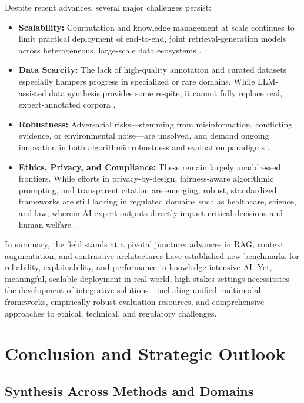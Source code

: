 Despite recent advances, several major challenges persist:
\begin{itemize}
    \item \textbf{Scalability:} Computation and knowledge management at scale continues to limit practical deployment of end-to-end, joint retrieval-generation models across heterogeneous, large-scale data ecosystems \cite{ref1,ref4,ref7,ref10,ref21,ref29,ref38,ref46,ref49,ref51,ref52,ref54,ref61,ref62}.
    \item \textbf{Data Scarcity:} The lack of high-quality annotation and curated datasets especially hampers progress in specialized or rare domains. While LLM-assisted data synthesis provides some respite, it cannot fully replace real, expert-annotated corpora \cite{ref8,ref16,ref19,ref22,ref26,ref28,ref31,ref34,ref36}.
    \item \textbf{Robustness:} Adversarial risks—stemming from misinformation, conflicting evidence, or environmental noise—are unsolved, and demand ongoing innovation in both algorithmic robustness and evaluation paradigms \cite{ref2,ref3,ref7,ref37,ref39,ref49,ref51,ref54}.
    \item \textbf{Ethics, Privacy, and Compliance:} These remain largely unaddressed frontiers. While efforts in privacy-by-design, fairness-aware algorithmic prompting, and transparent citation are emerging, robust, standardized frameworks are still lacking in regulated domains such as healthcare, science, and law, wherein AI-expert outputs directly impact critical decisions and human welfare \cite{ref6,ref13,ref23,ref30,ref37,ref45,ref55,ref62,ref63}.
\end{itemize}

In summary, the field stands at a pivotal juncture: advances in RAG, context augmentation, and contrastive architectures have established new benchmarks for reliability, explainability, and performance in knowledge-intensive AI. Yet, meaningful, scalable deployment in real-world, high-stakes settings necessitates the development of integrative solutions—including unified multimodal frameworks, empirically robust evaluation resources, and comprehensive approaches to ethical, technical, and regulatory challenges.

\section{Conclusion and Strategic Outlook}

\subsection{Synthesis Across Methods and Domains}

